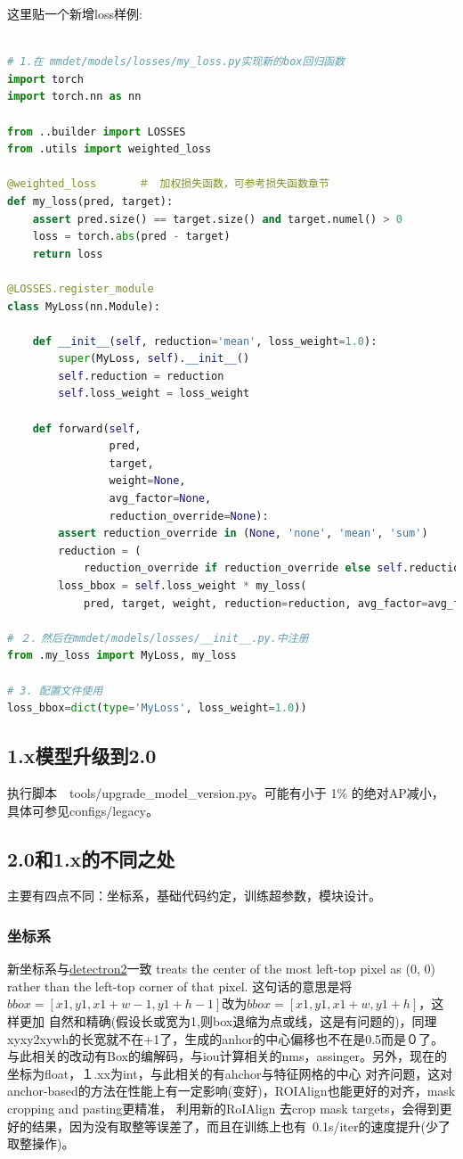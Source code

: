 \documentclass[UTF8]{ctexart}
\begin{document}
这里贴一个新增loss样例:
\lstset{style=mystyle}
\begin{lstlisting}[language=Python]

# 1.在 mmdet/models/losses/my_loss.py实现新的box回归函数
import torch
import torch.nn as nn

from ..builder import LOSSES
from .utils import weighted_loss

@weighted_loss　　　　＃　加权损失函数，可参考损失函数章节
def my_loss(pred, target):
	assert pred.size() == target.size() and target.numel() > 0
	loss = torch.abs(pred - target)
	return loss

@LOSSES.register_module
class MyLoss(nn.Module):

	def __init__(self, reduction='mean', loss_weight=1.0):
		super(MyLoss, self).__init__()
		self.reduction = reduction
		self.loss_weight = loss_weight

	def forward(self,
				pred,
				target,
				weight=None,
				avg_factor=None,
				reduction_override=None):
		assert reduction_override in (None, 'none', 'mean', 'sum')
		reduction = (
			reduction_override if reduction_override else self.reduction)
		loss_bbox = self.loss_weight * my_loss(
			pred, target, weight, reduction=reduction, avg_factor=avg_factor)

# ２．然后在mmdet/models/losses/__init__.py.中注册
from .my_loss import MyLoss, my_loss

# 3. 配置文件使用
loss_bbox=dict(type='MyLoss', loss_weight=1.0))

\end{lstlisting}

\subsection{1.x模型升级到2.0}

执行脚本　tools/upgrade\_model\_version.py。可能有小于 1\% 的绝对AP减小，具体可参见configs/legacy。

\subsection{2.0和1.x的不同之处}
主要有四点不同：坐标系，基础代码约定，训练超参数，模块设计。

\subsubsection{坐标系}
新坐标系与\href{https://github.com/facebookresearch/detectron2/}{detectron2}一致
treats the center of the most left-top pixel as (0, 0) rather than the left-top corner of that pixel. 
这句话的意思是将$bbox = [x1, y1, x1 + w - 1, y1 + h - 1]$改为$bbox = [x1, y1, x1 + w, y1 + h]$，这样更加
自然和精确(假设长或宽为1,则box退缩为点或线，这是有问题的)，同理xyxy2xywh的长宽就不在+1了，生成的anhor的中心偏移也不在是0.5而是０了。
与此相关的改动有Box的编解码，与iou计算相关的nms，assinger。另外，现在的坐标为float，１.xx为int，与此相关的有ahchor与特征网格的中心
对齐问题，这对anchor-based的方法在性能上有一定影响(变好)，ROIAlign也能更好的对齐，mask cropping and pasting更精准，
利用新的RoIAlign 去crop mask targets，会得到更好的结果，因为没有取整等误差了，而且在训练上也有~0.1s/iter的速度提升(少了取整操作)。
\end{document}
